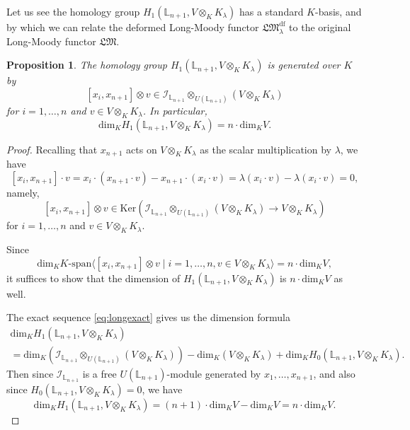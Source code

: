 \documentclass[a4paper,12pt]{article}
\newtheorem{prop}[thm]{Proposition}
\theoremstyle{definition}
\theoremstyle{remark}
\begin{document}
Let us see the homology group $H_1(\mathbb{L}_{n+1}, V\otimes_{K} K_{\lambda})$ has a 
standard $K$-basis, and by which 
we can relate the deformed Long-Moody functor $\mathfrak{LM}^{\mathrm{df}}_{\lambda}$ to the original Long-Moody functor $\mathfrak{LM}$.
\begin{prop}
The homology group
$H_1(\mathbb{L}_{n+1}, V\otimes_{K} K_{\lambda})$
is generated over $K$ by  
\[
	[x_{i},x_{n+1}]\otimes v\in \mathcal{I}_{\mathbb{L}_{n+1}}\otimes_{U(\mathbb{L}_{n+1})}
	(V\otimes_{K}K_{\lambda})
\]
for $i=1,\ldots,n$ and $v\in V\otimes_{K}K_{\lambda}$.
In particular, 
\[
	\mathrm{dim}_{K}H_1(\mathbb{L}_{n+1}, V\otimes_{K} K_{\lambda})
	=n\cdot \mathrm{dim}_{K}V.
\]
\end{prop}
\begin{proof}
Recalling that $x_{n+1}$ acts on $V\otimes_{K} K_{\lambda}$ as the scalar multiplication by $\lambda$,
we have
\[
	[x_{i},x_{n+1}]\cdot v
	=x_{i}\cdot (x_{n+1}\cdot v)-x_{n+1}\cdot (x_{i}\cdot v)
	=\lambda (x_{i}\cdot v)-\lambda (x_{i}\cdot v)=0,
\]
namely,
\[
	 [x_{i},x_{n+1}]\otimes v
	 \in  \mathrm{Ker}\left(\mathcal{I}_{\mathbb{L}_{n+1}}\otimes_{U(\mathbb{L}_{n+1})} (V\otimes_{K} K_{\lambda})\rightarrow V\otimes_{K} K_{\lambda}\right)
\]
for $i=1,\ldots,n$ and $v\in V\otimes_{K}K_{\lambda}$.
 
Since 
\[
	\mathrm{dim}_{K}K\text{-span}\langle [x_{i},x_{n+1}]\otimes v\mid  
	i=1,\ldots,n, v\in V\otimes_{K}K_{\lambda}\rangle
	=n\cdot \mathrm{dim}_{K}V,
\]
it suffices to show that the dimension of 
$H_1(\mathbb{L}_{n+1}, V\otimes_{K} K_{\lambda})$
is $n\cdot \mathrm{dim}_{K}V$ as well.

The exact sequence \eqref{eq:longexact} gives us the dimension formula
\begin{multline*}
	\mathrm{dim}_{K}H_1(\mathbb{L}_{n+1}, V\otimes_{K} K_{\lambda})
	\\=\mathrm{dim}_{K}(\mathcal{I}_{\mathbb{L}_{n+1}}\otimes_{U(\mathbb{L}_{n+1})} (V\otimes_{K} K_{\lambda}))
	-\mathrm{dim}_{K}(V\otimes_{K} K_{\lambda})
	+\mathrm{dim}_{K}H_{0}(\mathbb{L}_{n+1}, V\otimes_{K} K_{\lambda}).
\end{multline*}
Then since $\mathcal{I}_{\mathbb{L}_{n+1}}$ is a free $U(\mathbb{L}_{n+1})$-module generated by $x_{1},\ldots,x_{n+1}$, 
and also since $H_{0}(\mathbb{L}_{n+1}, V\otimes_{K} K_{\lambda})=0$, we have
\[
\mathrm{dim}_{K}H_1(\mathbb{L}_{n+1}, V\otimes_{K} K_{\lambda})
	=(n+1)\cdot \mathrm{dim}_{K}V-\mathrm{dim}_{K}V
	=n\cdot \mathrm{dim}_{K}V.
\]
\end{proof}
\end{document}
